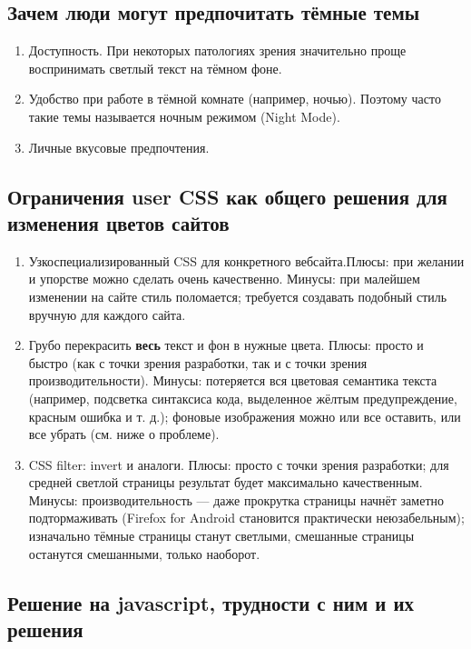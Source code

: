 \documentclass[10pt, a5paper]{article}
\begin{document}
\subsection*{Зачем люди могут предпочитать тёмные темы}

\begin{enumerate}
  \item Доступность. При некоторых патологиях зрения значительно проще воспринимать светлый текст на тёмном фоне.
  \item Удобство при работе в тёмной комнате (например, ночью). Поэтому часто такие темы называется ночным режимом (Night Mode).
  \item Личные вкусовые предпочтения.
\end{enumerate}

\subsection*{Ограничения user CSS как общего решения для изменения цветов сайтов}

\begin{enumerate}
  \item Узкоспециализированный CSS для конкретного вебсайта.\linebreak Плюсы: при желании и упорстве можно сделать очень качественно. Минусы: при малейшем изменении на сайте стиль поломается; требуется создавать подобный стиль вручную для каждого сайта.
  \item Грубо перекрасить \textbf{весь} текст и фон в нужные цвета. Плюсы: просто и быстро (как с точки зрения разработки, так и с точки зрения производительности). Минусы: потеряется вся цветовая семантика текста (например, подсветка синтаксиса кода, выделенное жёлтым предупреждение, красным ошибка и т. д.); фоновые изображения можно или все оставить, или все убрать (см. ниже о проблеме).
  \item CSS filter: invert и аналоги. Плюсы: просто с точки зрения разработки; для средней светлой страницы результат будет максимально качественным. Минусы: производительность ­— даже прокрутка страницы начнёт заметно подтормаживать (Firefox for Android становится практически неюзабельным); изначально тёмные страницы станут светлыми, смешанные страницы останутся смешанными, только наоборот.
\end{enumerate}

\subsection*{Решение на javascript, трудности с ним и их решения}
\end{document}
